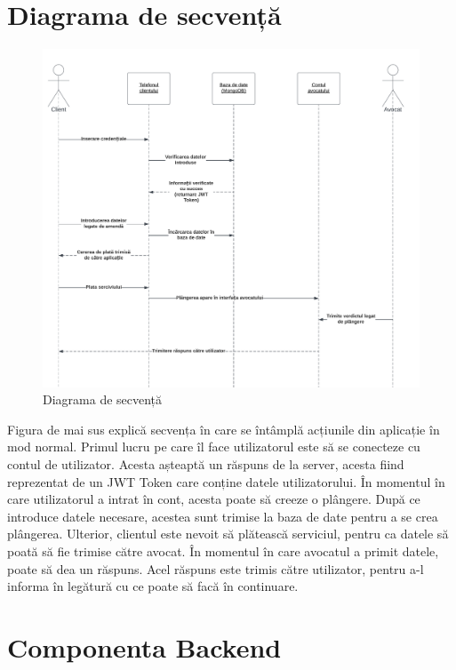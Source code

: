 \documentclass[12pt,a4paper]{report}
\theoremstyle{definition}
\theoremstyle{remark}
\begin{document}
\section{Diagrama de secvență}
\vspace{30pt}
\begin{center}
\begin{figure}[H]
    	\centering
    	\includegraphics[scale=0.7]{images/seq_diagram.png}
	\caption{Diagrama de secvență}
\end{figure}
\end{center}
Figura de mai sus explică secvența în care se întâmplă acțiunile din aplicație în mod normal. Primul lucru pe care îl face utilizatorul este să se conecteze cu contul de utilizator. Acesta așteaptă un răspuns de la server, acesta fiind reprezentat de un JWT Token care conține datele utilizatorului. În momentul în care utilizatorul a intrat în cont, acesta poate să creeze o plângere. După ce introduce datele necesare, acestea sunt trimise la baza de date pentru a se crea plângerea. Ulterior, clientul este nevoit să plătească serviciul, pentru ca datele să poată să fie trimise către avocat. În momentul în care avocatul a primit datele, poate să dea un răspuns. Acel răspuns este trimis către utilizator, pentru a-l informa în legătură cu ce poate să facă în continuare.
\newpage
\section{Componenta Backend}
\end{document}
